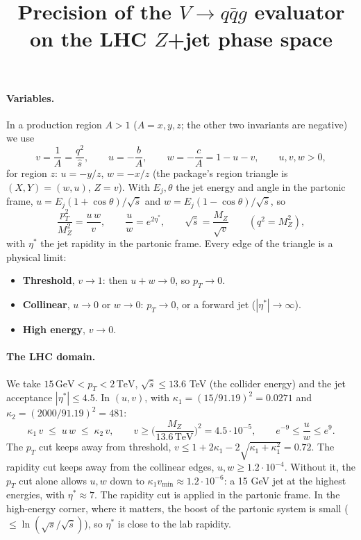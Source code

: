 \documentclass[11pt]{article}
\title{Precision of the $V\to q\bar q g$ evaluator on the LHC $Z$+jet phase space}
\date{}
\begin{document}
\maketitle

\paragraph{Variables.} In a production region $A>1$ ($A=x,y,z$; the other two invariants are negative) we use
\[
  v=\frac1A=\frac{q^2}{\hat s},\qquad u=-\frac bA,\qquad w=-\frac cA=1-u-v,\qquad u,v,w>0,
\]
for region $z$: $u=-y/z$, $w=-x/z$ (the package's region triangle is $(X,Y)=(w,u)$, $Z=v$). With $E_j,\theta$ the jet
energy and angle in the partonic frame, $u=E_j(1+\cos\theta)/\sqrt{\hat s}$ and $w=E_j(1-\cos\theta)/\sqrt{\hat s}$, so
\[
  \frac{p_T^2}{M_Z^2}=\frac{u\,w}{v},\qquad \frac uw=e^{2\eta^*},\qquad \sqrt{\hat s}=\frac{M_Z}{\sqrt v}\qquad(q^2=M_Z^2),
\]
with $\eta^*$ the jet rapidity in the partonic frame. Every edge of the triangle is a physical limit:
\begin{itemize}
\item \textbf{Threshold}, $v\to1$: then $u+w\to0$, so $p_T\to0$.
\item \textbf{Collinear}, $u\to0$ or $w\to0$: $p_T\to0$, or a forward jet ($|\eta^*|\to\infty$).
\item \textbf{High energy}, $v\to0$.
\end{itemize}

\paragraph{The LHC domain.} We take
$15\,\text{GeV}<p_T<2\,\text{TeV}$, $\sqrt{\hat s}\le13.6$ TeV (the collider energy) and the jet acceptance
$|\eta^*|\le4.5$. In $(u,v)$, with $\kappa_1=(15/91.19)^2=0.0271$ and $\kappa_2=(2000/91.19)^2=481$:
\[
  \kappa_1\,v\;\le\;u\,w\;\le\;\kappa_2\,v,\qquad v\ge\Big(\frac{M_Z}{13.6\,\text{TeV}}\Big)^2=4.5\cdot10^{-5},\qquad
  e^{-9}\le\frac uw\le e^{9}.
\]
The $p_T$ cut keeps away from threshold, $v\le1+2\kappa_1-2\sqrt{\kappa_1+\kappa_1^2}=0.72$. The rapidity cut keeps away
from the collinear edges, $u,w\ge1.2\cdot10^{-4}$. Without it, the $p_T$ cut alone allows $u,w$ down to
$\kappa_1v_{\min}\approx1.2\cdot10^{-6}$: a 15 GeV jet at the highest energies, with $\eta^*\approx7$.
The rapidity cut is applied in the partonic frame. In the high-energy corner, where it matters, the boost of the partonic
system is small ($\le\ln(\sqrt s/\sqrt{\hat s})$), so $\eta^*$ is close to the lab rapidity.
\end{document}
